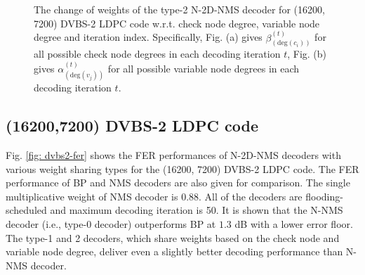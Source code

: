 \documentclass [PhD] {uclathes}
\begin{document}
\begin{figure}[t] 
    \centering
  \hfill
  \caption{ The change of weights of the type-2 N-2D-NMS decoder for (16200, 7200) DVBS-2 LDPC code w.r.t. check node degree, variable node degree and iteration index.
  Specifically, Fig. (a) gives $\beta^{(t)}_{(\text{deg}({c_i}))}$ for all possible check node degrees in each decoding iteration $t$, Fig. (b) gives $\alpha^{(t)}_{(\text{deg}({v_j}))}$ for all possible variable node degrees in each decoding iteration $t$.}
\end{figure}

\subsection{(16200,7200) DVBS-2 LDPC code}
Fig. \ref{fig: dvbs2-fer} shows the FER performances of N-2D-NMS decoders with various weight sharing types for the (16200, 7200) DVBS-2 LDPC code. 
The FER performance of BP and NMS decoders are also given for comparison.  The single multiplicative weight of  NMS decoder is 0.88.
All of the decoders are flooding-scheduled and maximum decoding iteration is 50. 
It is shown that the N-NMS decoder (i.e., type-0 decoder) outperforms BP at $1.3$ dB with a lower error floor. The type-1 and 2 decoders, which share weights based on the check node and variable node degree, deliver even a slightly better decoding performance than N-NMS decoder.
\end{document}
